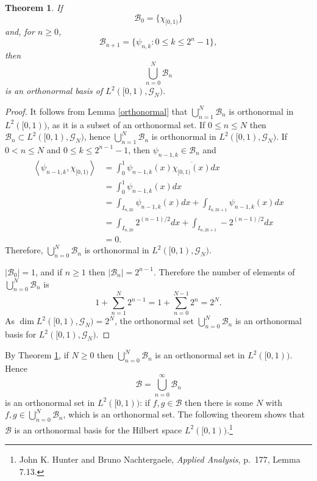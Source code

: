 \documentclass{article}
\newcommand{\inner}[2]{\left\langle #1, #2 \right\rangle}
\newtheorem{theorem}{Theorem}
\theoremstyle{definition}
\begin{document}
\begin{theorem}
If
\[
\mathscr{B}_0=\{\chi_{[0,1)}\}
\]
and, for $n \geq 0$,
\[
\mathscr{B}_{n+1}=\{\psi_{n,k}: 0 \leq k \leq 2^n-1\},
\]
then
\[
\bigcup_{n=0}^N \mathscr{B}_n
\]
is an orthonormal basis of $L^2([0,1),\mathscr{G}_N)$.
\label{orthonormalGN}
\end{theorem}
\begin{proof}
It follows from Lemma \ref{orthonormal} that $\bigcup_{n=1}^N \mathscr{B}_n$ is orthonormal
in  $L^2([0,1))$, as it is a subset of an orthonormal set.
If $0 \leq n \leq N$ then $\mathscr{B}_n \subset L^2([0,1),\mathscr{G}_N)$, hence
$\bigcup_{n=1}^N \mathscr{B}_n$ is orthonormal  in $L^2([0,1),\mathscr{G}_N)$.
If $0 <n \leq N$ and $0 \leq k \leq 2^{n-1}-1$, then $\psi_{n-1,k} \in \mathscr{B}_n$ and
\begin{align*}
\inner{\psi_{n-1,k}}{\chi_{[0,1)}}&=\int_0^1 \psi_{n-1,k}(x) \overline{\chi_{[0,1)}(x)}dx\\
&=\int_0^1 \psi_{n-1,k}(x)dx\\
&=\int_{I_{n,2k}} \psi_{n-1,k}(x) dx + \int_{I_{n,2k+1}} \psi_{n-1,k}(x) dx\\
&=\int_{I_{n,2k}} 2^{(n-1)/2} dx + \int_{I_{n,2k+1}} -2^{(n-1)/2} dx\\
&=0.
\end{align*} 
Therefore, $\bigcup_{n=0}^N \mathscr{B}_n$ is orthonormal in $L^2([0,1),\mathscr{G}_N)$.


$|\mathscr{B}_0|=1$, and if $n \geq 1$ then $|\mathscr{B}_n|=2^{n-1}$. Therefore
the number of elements of $\bigcup_{n=0}^N \mathscr{B}_n$ is
\[
1+\sum_{n=1}^N 2^{n-1} = 1+\sum_{n=0}^{N-1} 2^n = 2^N.
\]
As $\dim L^2([0,1),\mathscr{G}_N)=2^N$, the orthonormal set $\bigcup_{n=0}^N \mathscr{B}_n$ is an orthonormal basis for $L^2([0,1),\mathscr{G}_N)$.
\end{proof}


By Theorem \ref{orthonormalGN}, if $N \geq 0$ then $\bigcup_{n=0}^N \mathscr{B}_n$ is an orthonormal set in $L^2([0,1))$.
Hence
\[
\mathscr{B}=\bigcup_{n=0}^\infty \mathscr{B}_n
\]
 is an orthonormal set in $L^2([0,1))$: if $f,g \in \mathscr{B}$ then there is some $N$ with $f,g \in
 \bigcup_{n=0}^N \mathscr{B}_n$, which is an orthonormal set.
The following theorem shows that $\mathscr{B}$ is an orthonormal basis for the Hilbert space $L^2([0,1))$.\footnote{John K. Hunter and Bruno
Nachtergaele, {\em Applied Analysis}, p.~177, Lemma 7.13.}
\end{document}
